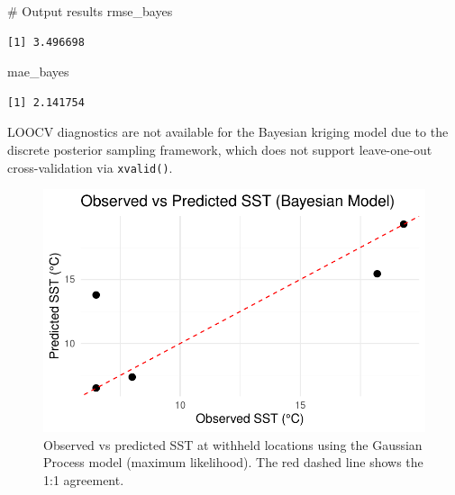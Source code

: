 \documentclass[
  11pt,
]{article}
\newenvironment{Shaded}{\begin{snugshade}}{\end{snugshade}}
\newcommand{\CommentTok}[1]{\textcolor[rgb]{0.37,0.37,0.37}{#1}}
\newcommand{\NormalTok}[1]{\textcolor[rgb]{0.00,0.23,0.31}{#1}}
\begin{document}
\begin{Shaded}
\begin{Highlighting}[]
\CommentTok{\# Output results}
\NormalTok{rmse\_bayes}
\end{Highlighting}
\end{Shaded}

\begin{verbatim}
[1] 3.496698
\end{verbatim}

\begin{Shaded}
\begin{Highlighting}[]
\NormalTok{mae\_bayes}
\end{Highlighting}
\end{Shaded}

\begin{verbatim}
[1] 2.141754
\end{verbatim}

LOOCV diagnostics are not available for the Bayesian kriging model due
to the discrete posterior sampling framework, which does not support
leave-one-out cross-validation via \texttt{xvalid()}.

\begin{figure}[H]

{\centering \includegraphics{project_files/figure-pdf/fig-bayes_pred_scatter-1.pdf}

}

\caption{Observed vs predicted SST at withheld locations using the
Gaussian Process model (maximum likelihood). The red dashed line shows
the 1:1 agreement.}

\end{figure}%
\end{document}
